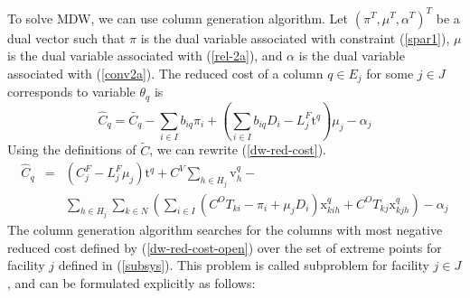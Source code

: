 To solve MDW, we can use column generation algorithm. 
Let $(\pi ^ T, \mu ^T, \alpha^T)^T$ be a dual vector such that
$\pi$ is the dual variable associated with constraint (\ref{spar1}), 
$\mu$ is the dual variable associated with (\ref{rel-2a}), 
and $\alpha$ is the dual variable associated with (\ref{conv2a}). 
The reduced cost of a column $q \in E_j$ for some $j \in J$ 
corresponds to variable $\theta_q$ is 
\begin{equation}
\label{dw-red-cost}
\hat{C}_{q} = \tilde{C_{q}} - \sum_{i\in I}b_{iq}\pi_{i} + 
\left(\sum_{i \in I}b_{iq}D_{i} - L^F_j \mbox{t}^{q}\right)\mu_{j} - \alpha_j
\end{equation}
Using the definitions of $\tilde{C}$,  we can rewrite (\ref{dw-red-cost}).
\begin{eqnarray}
\label{dw-red-cost-open}
\hat{C}_q & = &(C^F_j-L^F_j \mu_j)\mbox{t}^q + C^V \sum_{h \in H_j}\mbox{v}_h^q - \nonumber\\
              & & \sum_{h \in H_j}\sum_{k \in N} (\sum_{i \in I} (C^O T_{ki} - \pi_{i} 
              + \mu_{j}D_{i})\mbox{x}_{kih}^q + C^OT_{kj}\mbox{x}_{kjh}^q)- \alpha_j
\end{eqnarray} 
The column generation algorithm searches for the columns with most negative 
reduced cost defined by (\ref{dw-red-cost-open}) over the set of extreme points
for facility $j$ defined in (\ref{subsys}). This problem is called subproblem  
for facility $j \in J$, and can be formulated explicitly as follows:

